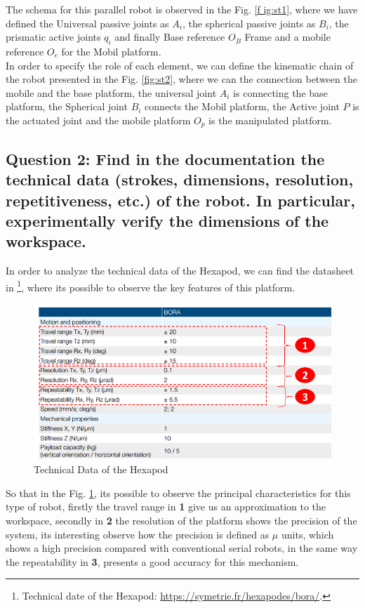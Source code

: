 \documentclass[12pt, twoside]{report}
\begin{document}
The schema for this parallel robot is observed in the Fig. \ref{f   ig:st1}, where we have defined the Universal passive joints as $A_i$, the spherical passive joints as $B_i$, the prismatic active joints $q_i$ and finally Base reference $O_B$ Frame and a mobile reference $O_e$ for the Mobil platform. \\
In order to specify the role of each element, we can define the kinematic chain of the robot presented in the Fig. \ref{fig:st2}, where we can the connection between the mobile and the base platform, the universal joint $A_i$ is connecting the base platform, the Spherical joint $B_i$ connects the Mobil platform, the Active joint $P$ is the actuated joint and the mobile platform $O_p$ is the manipulated platform.


\subsection{\textbf{Question 2:} Find in the documentation the technical data (strokes, dimensions, resolution,
repetitiveness, etc.) of the robot. In particular, experimentally verify the dimensions of the
workspace.}

In order to analyze the technical data of the Hexapod, we can find the datasheet in \footnote{Technical date of the Hexapod: \url{https://symetrie.fr/hexapodes/bora/}.}, where its possible to observe the key features of this platform. 
\begin{figure}[H]
    \centering
    \includegraphics[width=\textwidth]{TP_2/charact1.png}
    \caption{ Technical Data of the Hexapod}
    \label{fig:char1}
\end{figure}
So that in the Fig. \ref{fig:char1}, its possible to observe the principal characteristics for this type of robot, firstly the travel range  in \textbf{1} give us an approximation to the workspace, secondly in \textbf{2} the resolution of the platform shows the precision of the system, its interesting observe how the precision is defined as $\mu$ units, which shows a high precision compared with conventional serial robots, in the same way the repeatability in \textbf{3}, presents a good accuracy for this mechanism. 
\end{document}

